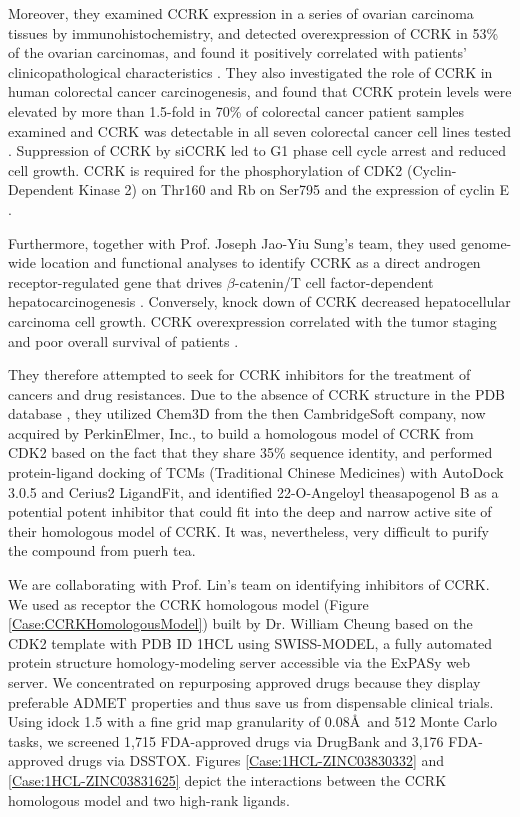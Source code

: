 Moreover, they examined CCRK expression in a series of ovarian carcinoma tissues by immunohistochemistry, and detected overexpression of CCRK in 53\% of the ovarian carcinomas, and found it positively correlated with patients' clinicopathological characteristics \citep{1145}. They also investigated the role of CCRK in human colorectal cancer carcinogenesis, and found that CCRK protein levels were elevated by more than 1.5-fold in 70\% of colorectal cancer patient samples examined and CCRK was detectable in all seven colorectal cancer cell lines tested \citep{1143}. Suppression of CCRK by siCCRK led to G1 phase cell cycle arrest and reduced cell growth. CCRK is required for the phosphorylation of CDK2 (Cyclin-Dependent Kinase 2) on Thr160 and Rb on Ser795 and the expression of cyclin E \citep{1143}. 

Furthermore, together with Prof. Joseph Jao-Yiu Sung's team, they used genome-wide location and functional analyses to identify CCRK as a direct androgen receptor-regulated gene that drives $\beta$-catenin/T cell factor-dependent hepatocarcinogenesis \citep{1146}. Conversely, knock down of CCRK decreased hepatocellular carcinoma cell growth. CCRK overexpression correlated with the tumor staging and poor overall survival of patients \citep{1146}.

They therefore attempted to seek for CCRK inhibitors for the treatment of cancers and drug resistances. Due to the absence of CCRK structure in the PDB database \citep{540,537}, they utilized Chem3D from the then CambridgeSoft company, now acquired by PerkinElmer, Inc., to build a homologous model of CCRK from CDK2 based on the fact that they share 35\% sequence identity, and performed protein-ligand docking of TCMs (Traditional Chinese Medicines) with AutoDock 3.0.5 and Cerius2 LigandFit, and identified 22-O-Angeloyl theasapogenol B as a potential potent inhibitor that could fit into the deep and narrow active site of their homologous model of CCRK. It was, nevertheless, very difficult to purify the compound from puerh tea.

We are collaborating with Prof. Lin's team on identifying inhibitors of CCRK. We used as receptor the CCRK homologous model (Figure \ref{Case:CCRKHomologousModel}) built by Dr. William Cheung based on the CDK2 template with PDB ID 1HCL \citep{1142} using SWISS-MODEL, a fully automated protein structure homology-modeling server accessible via the ExPASy web server. We concentrated on repurposing approved drugs because they display preferable ADMET properties and thus save us from dispensable clinical trials. Using idock 1.5 with a fine grid map granularity of 0.08\AA\ and 512 Monte Carlo tasks, we screened 1,715 FDA-approved drugs via DrugBank and 3,176 FDA-approved drugs via DSSTOX. Figures \ref{Case:1HCL-ZINC03830332} and \ref{Case:1HCL-ZINC03831625} depict the interactions between the CCRK homologous model and two high-rank ligands.

